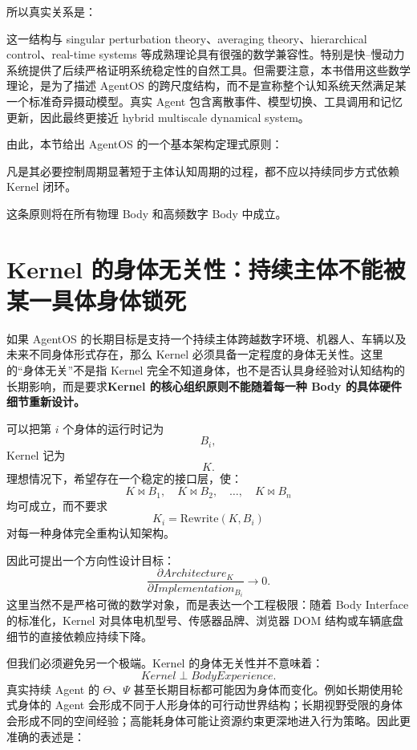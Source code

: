 所以真实关系是：
\begin{statementbox}
\centering
{}
\end{statementbox}

这一结构与 singular perturbation theory、averaging theory、hierarchical control、real-time systems 等成熟理论具有很强的数学兼容性。特别是快--慢动力系统提供了后续严格证明系统稳定性的自然工具。但需要注意，本书借用这些数学理论，是为了描述 AgentOS 的跨尺度结构，而不是宣称整个认知系统天然满足某一个标准奇异摄动模型。真实 Agent 包含离散事件、模型切换、工具调用和记忆更新，因此最终更接近 hybrid multiscale dynamical system。

由此，本节给出 AgentOS 的一个基本架构定理式原则：
\begin{proposition*}
凡是其必要控制周期显著短于主体认知周期的过程，都不应以持续同步方式依赖 Kernel 闭环。
\end{proposition*}

这条原则将在所有物理 Body 和高频数字 Body 中成立。

\section{Kernel 的身体无关性：持续主体不能被某一具体身体锁死}

如果 AgentOS 的长期目标是支持一个持续主体跨越数字环境、机器人、车辆以及未来不同身体形式存在，那么 Kernel 必须具备一定程度的身体无关性。这里的“身体无关”不是指 Kernel 完全不知道身体，也不是否认具身经验对认知结构的长期影响，而是要求\textbf{Kernel 的核心组织原则不能随着每一种 Body 的具体硬件细节重新设计。}

可以把第 $i$ 个身体的运行时记为
\[
B_i,
\]
Kernel 记为
\[
K.
\]
理想情况下，希望存在一个稳定的接口层，使：
\[
K
\bowtie
B_1,
\quad
K
\bowtie
B_2,
\quad
\ldots,
\quad
K
\bowtie
B_n
\]
均可成立，而不要求
\[
K_i
=
\text{Rewrite}(K,B_i)
\]
对每一种身体完全重构认知架构。

因此可提出一个方向性设计目标：
\[
\boxed{
\frac{\partial Architecture_K}
{\partial Implementation_{B_i}}
\rightarrow 0.
}
\]
这里当然不是严格可微的数学对象，而是表达一个工程极限：随着 Body Interface 的标准化，Kernel 对具体电机型号、传感器品牌、浏览器 DOM 结构或车辆底盘细节的直接依赖应持续下降。

但我们必须避免另一个极端。Kernel 的身体无关性并不意味着：
\[
Kernel
\perp
BodyExperience.
\]
真实持续 Agent 的 $\Theta$、$\Psi$ 甚至长期目标都可能因为身体而变化。例如长期使用轮式身体的 Agent 会形成不同于人形身体的可行动世界结构；长期视野受限的身体会形成不同的空间经验；高能耗身体可能让资源约束更深地进入行为策略。因此更准确的表述是：
\begin{statementbox}
\centering
{}
\end{statementbox}

